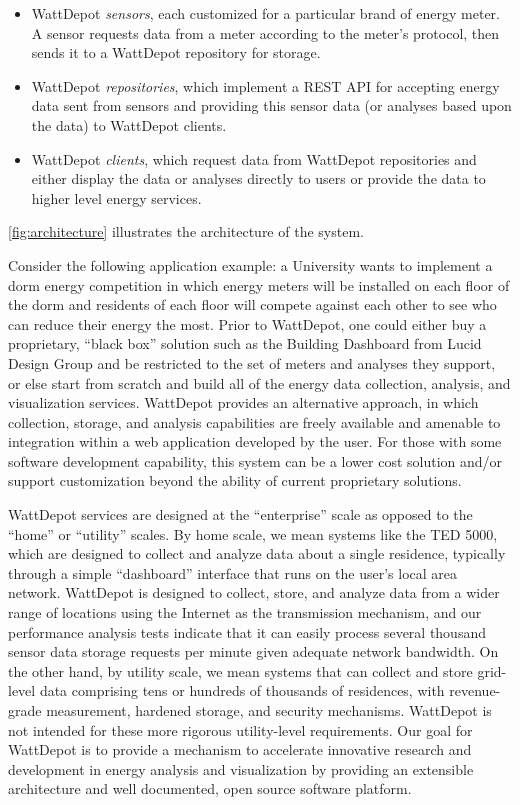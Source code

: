 \documentclass[conference]{IEEEtran}
\begin{document}
\begin{itemize}
\item WattDepot {\em sensors}, each customized for a particular brand of
energy meter.  A sensor requests data from a meter according to the meter's
protocol, then sends it to a WattDepot repository for storage.

\item WattDepot {\em repositories}, which implement a REST \cite{REST} API
for accepting energy data sent from sensors and providing this sensor data
(or analyses based upon the data) to WattDepot clients.

\item WattDepot {\em clients}, which request data from WattDepot
repositories and either display the data or analyses directly to users or
provide the data to higher level energy services.
\end{itemize}

\figurename \ref{fig:architecture} illustrates the architecture of the system.


Consider the following application example: a University wants to implement
a dorm energy competition in which energy meters will be installed on each
floor of the dorm and residents of each floor will compete against each other
to see who can reduce their energy the most.  Prior to WattDepot, one could
either buy a proprietary, ``black box'' solution such as the Building Dashboard
from Lucid Design Group and be restricted to the set of meters and analyses they
support, or else start from scratch and build all of the energy data
collection, analysis, and visualization services.  WattDepot provides an
alternative approach, in which collection, storage, and analysis
capabilities are freely available and amenable to integration within a web
application developed by the user.  For those with some software
development capability, this system can be a lower cost solution and/or support
customization beyond the ability of current proprietary solutions.

WattDepot services are designed at the ``enterprise'' scale as opposed to
the ``home'' or ``utility'' scales.  By home scale, we mean systems like
the TED 5000, which are designed to collect and analyze data about a single
residence, typically through a simple ``dashboard'' interface that runs on
the user's local area network.  WattDepot is designed to
collect, store, and analyze data from a wider range of locations using the
Internet as the transmission mechanism, and our performance analysis tests
indicate that it can easily process several thousand sensor data storage
requests per minute given adequate network bandwidth.  On the other hand,
by utility scale, we mean systems that can collect and store grid-level
data comprising tens or hundreds of thousands of residences, with
revenue-grade measurement, hardened storage, and security mechanisms.
WattDepot is not intended for these more rigorous utility-level
requirements.  Our goal for WattDepot is to provide a mechanism to
accelerate innovative research and development in energy analysis and
visualization by providing an extensible architecture and well documented,
open source software platform.
\end{document}
